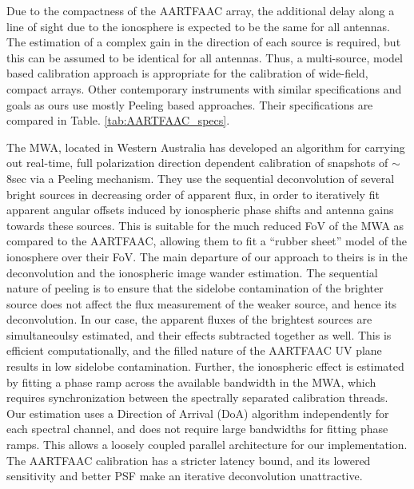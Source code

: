 \documentclass{aa}
\begin{document}
Due to the compactness of the  AARTFAAC array, the additional delay along a line
of sight due to the ionosphere is  expected to be the same for all antennas. The
estimation of  a complex gain in the  direction of each source  is required, but
this can  be assumed  to be  identical for all  antennas. Thus,  a multi-source,
model  based  calibration  approach   is  appropriate  for  the  calibration  of
wide-field,  compact  arrays.    Other  contemporary  instruments  with  similar
specifications and  goals as  ours use mostly  Peeling based  approaches.  Their
specifications are compared in Table.  \ref{tab:AARTFAAC_specs}.

The MWA\citep{lonsdale2009murchison}, located in Western Australia has developed
an algorithm  for carrying out real-time, full  polarization direction dependent
calibration     of     snapshots     of     $\sim$8sec     via     a     Peeling
mechanism\citep{mitchell2008real}.   They use  the  sequential deconvolution  of
several  bright  sources in  decreasing  order of  apparent  flux,  in order  to
iteratively fit apparent angular offsets induced by ionospheric phase shifts and
antenna gains towards  these sources. This is suitable for  the much reduced FoV
of the MWA as compared to the  AARTFAAC, allowing them to fit a ``rubber sheet''
model of the  ionosphere over their FoV.  The main departure  of our approach to
theirs is in the deconvolution and the ionospheric image wander estimation.  The
sequential nature of peeling is to ensure that the sidelobe contamination of the
brighter source does  not affect the flux measurement of  the weaker source, and
hence  its deconvolution.  In  our case,  the apparent  fluxes of  the brightest
sources are  simultaneoulsy estimated, and their effects  subtracted together as
well. This is  efficient computationally, and the filled  nature of the AARTFAAC
UV plane results in low  sidelobe contamination. Further, the ionospheric effect
is estimated by fitting a phase  ramp across the available bandwidth in the MWA,
which  requires  synchronization between  the  spectrally separated  calibration
threads.   Our   estimation  uses  a   Direction  of  Arrival   (DoA)  algorithm
independently for each  spectral channel, and does not  require large bandwidths
for fitting  phase ramps.  This  allows a loosely coupled  parallel architecture
for our implementation.  The AARTFAAC  calibration has a stricter latency bound,
and  its lowered  sensitivity and  better  PSF make  an iterative  deconvolution
unattractive.
\end{document}
